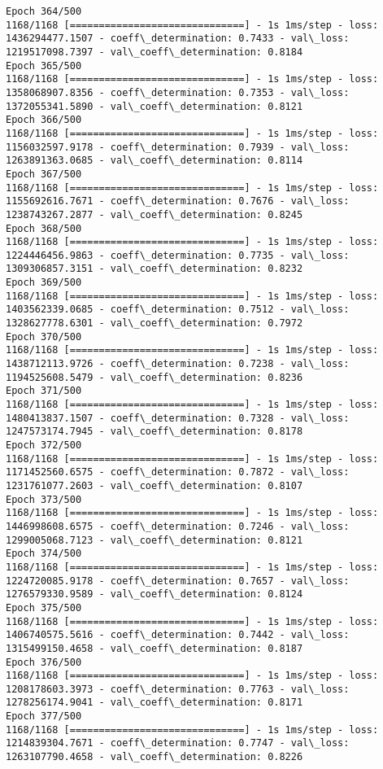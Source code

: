\documentclass[11pt]{article}
\begin{document}
\begin{Verbatim}[commandchars=\\\{\}]
Epoch 364/500
1168/1168 [==============================] - 1s 1ms/step - loss: 1436294477.1507 - coeff\_determination: 0.7433 - val\_loss: 1219517098.7397 - val\_coeff\_determination: 0.8184
Epoch 365/500
1168/1168 [==============================] - 1s 1ms/step - loss: 1358068907.8356 - coeff\_determination: 0.7353 - val\_loss: 1372055341.5890 - val\_coeff\_determination: 0.8121
Epoch 366/500
1168/1168 [==============================] - 1s 1ms/step - loss: 1156032597.9178 - coeff\_determination: 0.7939 - val\_loss: 1263891363.0685 - val\_coeff\_determination: 0.8114
Epoch 367/500
1168/1168 [==============================] - 1s 1ms/step - loss: 1155692616.7671 - coeff\_determination: 0.7676 - val\_loss: 1238743267.2877 - val\_coeff\_determination: 0.8245
Epoch 368/500
1168/1168 [==============================] - 1s 1ms/step - loss: 1224446456.9863 - coeff\_determination: 0.7735 - val\_loss: 1309306857.3151 - val\_coeff\_determination: 0.8232
Epoch 369/500
1168/1168 [==============================] - 1s 1ms/step - loss: 1403562339.0685 - coeff\_determination: 0.7512 - val\_loss: 1328627778.6301 - val\_coeff\_determination: 0.7972
Epoch 370/500
1168/1168 [==============================] - 1s 1ms/step - loss: 1438712113.9726 - coeff\_determination: 0.7238 - val\_loss: 1194525608.5479 - val\_coeff\_determination: 0.8236
Epoch 371/500
1168/1168 [==============================] - 1s 1ms/step - loss: 1480413837.1507 - coeff\_determination: 0.7328 - val\_loss: 1247573174.7945 - val\_coeff\_determination: 0.8178
Epoch 372/500
1168/1168 [==============================] - 1s 1ms/step - loss: 1171452560.6575 - coeff\_determination: 0.7872 - val\_loss: 1231761077.2603 - val\_coeff\_determination: 0.8107
Epoch 373/500
1168/1168 [==============================] - 1s 1ms/step - loss: 1446998608.6575 - coeff\_determination: 0.7246 - val\_loss: 1299005068.7123 - val\_coeff\_determination: 0.8121
Epoch 374/500
1168/1168 [==============================] - 1s 1ms/step - loss: 1224720085.9178 - coeff\_determination: 0.7657 - val\_loss: 1276579330.9589 - val\_coeff\_determination: 0.8124
Epoch 375/500
1168/1168 [==============================] - 1s 1ms/step - loss: 1406740575.5616 - coeff\_determination: 0.7442 - val\_loss: 1315499150.4658 - val\_coeff\_determination: 0.8187
Epoch 376/500
1168/1168 [==============================] - 1s 1ms/step - loss: 1208178603.3973 - coeff\_determination: 0.7763 - val\_loss: 1278256174.9041 - val\_coeff\_determination: 0.8171
Epoch 377/500
1168/1168 [==============================] - 1s 1ms/step - loss: 1214839304.7671 - coeff\_determination: 0.7747 - val\_loss: 1263107790.4658 - val\_coeff\_determination: 0.8226

\end{Verbatim}
\end{document}
